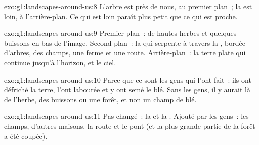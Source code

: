 \begin{solution}{exo:g1:landscapes-around-us:8}
L'arbre est près de nous, au premier plan~; la  est loin, à
l'arrière-plan. Ce qui est loin paraît plus petit que ce qui est proche.
\end{solution}

\begin{solution}{exo:g1:landscapes-around-us:9}
Premier plan~: de hautes herbes et quelques buissons en bas de l'image.
Second plan~: la  qui serpente à travers la , bordée
d'arbres, des champs, une ferme et une route.
Arrière-plan~: la terre plate qui continue jusqu'à l'horizon, et le ciel.
\end{solution}

\begin{solution}{exo:g1:landscapes-around-us:10}
Parce que ce sont les gens qui l'ont fait~: ils ont défriché la terre,
l'ont labourée et y ont semé le blé. Sans les gens, il y aurait là de
l'herbe, des buissons ou une forêt, et non un champ de blé.
\end{solution}

\begin{solution}{exo:g1:landscapes-around-us:11}
Pas changé~: la  et la . Ajouté par les gens~: les champs,
d'autres maisons, la route et le pont (et la plus grande partie de la
forêt a été coupée).
\end{solution}
